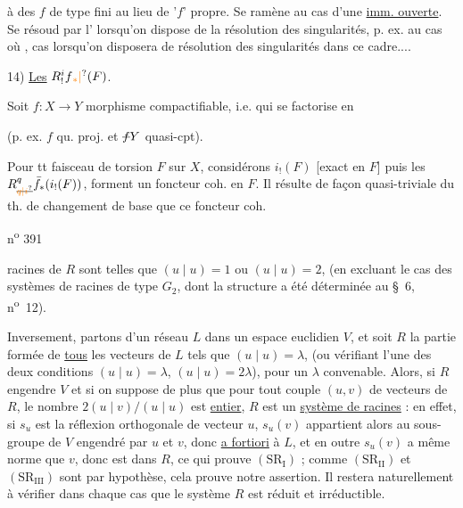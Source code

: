 à des $f$ de type fini au lieu de '$f$' propre. Se ramène au cas d'une \uline{imm. ouverte}. Se résoud par l' lorsqu'on dispose de la résolution des singularités, p. ex. au cas où ,   cas lorsqu'on disposera de résolution des singularités  dans ce cadre....

14) \uline{Les} $R^{i}_{!}f\unsure{{}_{*}|{}}(F)$.

Soit $f:X\longrightarrow Y$ morphisme compactifiable, i.e. qui se factorise en


(p. ex. $f$ qu. proj. et $\deleted{f}Y$ quasi-cpt).

Pour tt faisceau de torsion $F$ sur $X$, considérons $i_!(F)$ [exact en $F$] puis les $R^{q}_{\deleted{\unsure{q|i}}}\bar f_*(i_!(F))$, forment un foncteur coh. en $F$. Il résulte de façon quasi-triviale du th. de changement de base que ce foncteur coh.

\hfill n\textsuperscript{o} 391

racines de $R$ sont telles que $(u\mid u)=1$ ou $(u\mid u)=2$, (en excluant le cas des systèmes de racines de type $G_2$, dont la structure a été déterminée au \S~6, n\textsuperscript{o}~12).

Inversement, partons d'un réseau $L$ dans un espace euclidien $V$, et soit $R$ la partie formée de \uline{tous} les vecteurs de $L$ tels que $(u\mid u)=\lambda$, (ou vérifiant l'une des deux conditions $(u\mid u)=\lambda$, $(u\mid u)=2\lambda$), pour un $\lambda$ convenable. Alors, si $R$ engendre $V$ et si on suppose de plus que pour tout couple $(u,v)$ de vecteurs de $R$, le nombre $2(u\mid v)/(u\mid u)$ est \uline{entier}, $R$ est un \uline{système de racines} : en effet, si $s_u$ est la réflexion orthogonale de vecteur $u$, $s_u(v)$ appartient alors au sous-groupe de $V$ engendré par $u$ et $v$, donc \uline{a fortiori} à $L$, et en outre $s_u(v)$ a même norme que $v$, donc est dans $R$, ce qui prouve $(\mathrm{SR}_{\mathrm I})$ ; comme $(\mathrm{SR}_{\mathrm{II}})$ et $(\mathrm{SR}_{\mathrm{III}})$ sont  par hypothèse, cela prouve notre assertion. Il restera naturellement à vérifier dans chaque cas que le système $R$ est réduit et irréductible.

